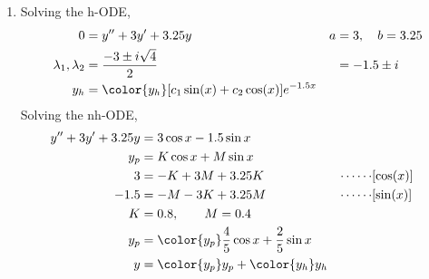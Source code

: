 \begin{enumerate}
    \item Solving the h-ODE,
          \begin{align}
              0                        & = y'' + 3y' + 3.25y                                  & a & = 3, \quad b = 3.25 \\
              \lambda_{1}, \lambda_{2} & = \frac{-3 \pm i\sqrt{4}}{2}                         &   & = -1.5 \pm i        \\
              y_{h}                    & = \color{y_h} [c_{1}\sin(x) + c_{2}\cos(x)]e^{-1.5x}
          \end{align}
          Solving the nh-ODE,
          \begin{align}
              y'' + 3y' + 3.25y & = 3\cos x - 1.5\sin x                                                          \\
              y_{p}             & = K \cos x + M \sin x                                                          \\
              3                 & = -K + 3M + 3.25K                                   & \cdots\cdots & [\cos(x)] \\
              -1.5              & = -M - 3K + 3.25M                                   & \cdots\cdots & [\sin(x)] \\
              K                 & = 0.8, \qquad M = 0.4                                                          \\
              y_{p}             & = \color{y_p} \frac{4}{5}\cos x + \frac{2}{5}\sin x                            \\
              y                 & = {\color{y_p} y_{p}} + {\color{y_h} y_{h}}
          \end{align}


\end{enumerate}
